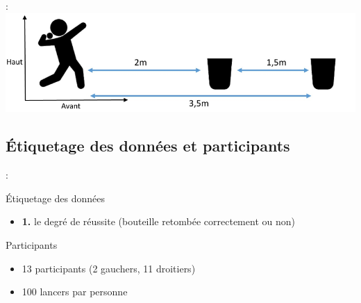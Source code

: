 \documentclass[svgnames]{beamer}
\begin{document}
	\begin{frame}{\secname : \subsecname}
		\centering
		\includegraphics[scale=0.5]{img/ball_throwing.png}
	\end{frame}
	
	\subsection{Étiquetage des données et participants}
	\begin{frame}{\secname : \subsecname}
		\begin{block}{Étiquetage des données}
			\begin{itemize}
				\item \textbf{1.} le degré de réussite (bouteille retombée correctement ou non)
			\end{itemize}
		\end{block}
	
		\begin{block}{Participants}
			\begin{itemize}[label=$\bullet$]
				\item 13 participants (2 gauchers, 11 droitiers)
				\item 100 lancers par personne
			\end{itemize}
		\end{block}
	\end{frame}
	
\end{document}
